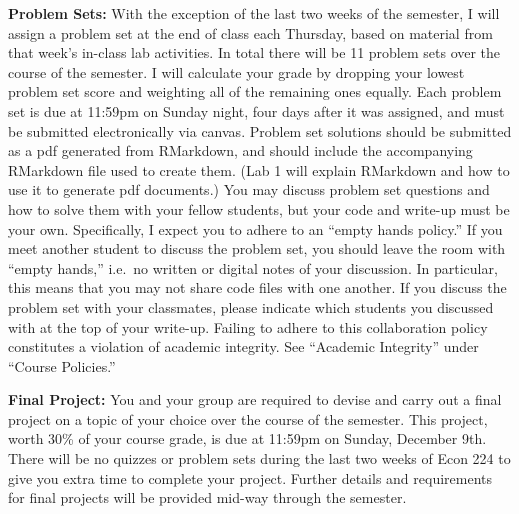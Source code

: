 \documentclass[11pt, letterpaper]{article}
\begin{document}
\medskip


\noindent \textbf{Problem Sets:} With the exception of the last two weeks of the semester, I will assign a problem set at the end of class each Thursday, based on material from that week's in-class lab activities.
In total there will be 11 problem sets over the course of the semester. 
I will calculate your grade by dropping your lowest problem set score and weighting all of the remaining ones equally.
Each problem set is due at 11:59pm on Sunday night, four days after it was assigned, and must be submitted electronically via canvas.
Problem set solutions should be submitted as a pdf generated from RMarkdown, and should include the accompanying RMarkdown file used to create them.
(Lab 1 will explain RMarkdown and how to use it to generate pdf documents.)
You may discuss problem set questions and how to solve them with your fellow students, but your code and write-up must be your own. 
Specifically, I expect you to adhere to an ``empty hands policy.'' 
If you meet another student to discuss the problem set, you should leave the room with ``empty hands,'' i.e.\ no written or digital notes of your discussion.
In particular, this means that you may not share code files with one another.
If you discuss the problem set with your classmates, please indicate which students you discussed with at the top of your write-up.
Failing to adhere to this collaboration policy constitutes a violation of academic integrity.
See ``Academic Integrity'' under ``Course Policies.'' 



\medskip

\noindent \textbf{Final Project:}
You and your group are required to devise and carry out a final project on a topic of your choice over the course of the semester.
This project, worth 30\% of your course grade, is due at 11:59pm on Sunday, December 9th.
There will be no quizzes or problem sets during the last two weeks of Econ 224 to give you extra time to complete your project.
Further details and requirements for final projects will be provided mid-way through the semester.


\newpage


\end{document}
